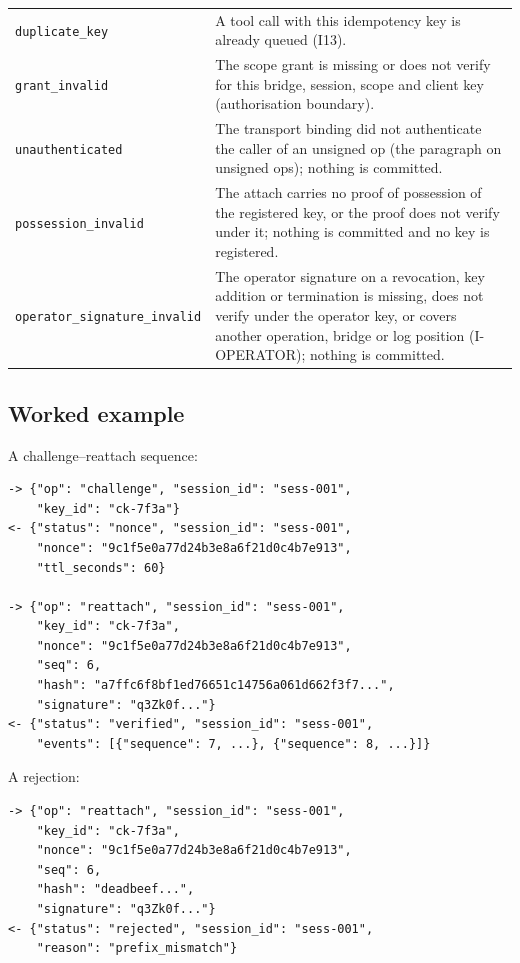 \begin{longtable}{p{} p{}}
\texttt{duplicate\_key} & A tool call with this idempotency key is already queued (I13). \\
\texttt{grant\_invalid} & The scope grant is missing or does not verify for this bridge, session, scope and client key (authorisation boundary). \\
\texttt{unauthenticated} & The transport binding did not authenticate the caller of an unsigned op (the paragraph on unsigned ops); nothing is committed. \\
\texttt{possession\_invalid} & The attach carries no proof of possession of the registered key, or the proof does not verify under it; nothing is committed and no key is registered. \\
\texttt{operator\_signature\_invalid} & The operator signature on a revocation, key addition or termination is missing, does not verify under the operator key, or covers another operation, bridge or log position (I-OPERATOR); nothing is committed. \\
\bottomrule
\end{longtable}

\subsection{Worked example}

A challenge--reattach sequence:

\begin{lstlisting}
-> {"op": "challenge", "session_id": "sess-001",
    "key_id": "ck-7f3a"}
<- {"status": "nonce", "session_id": "sess-001",
    "nonce": "9c1f5e0a77d24b3e8a6f21d0c4b7e913",
    "ttl_seconds": 60}

-> {"op": "reattach", "session_id": "sess-001",
    "key_id": "ck-7f3a",
    "nonce": "9c1f5e0a77d24b3e8a6f21d0c4b7e913",
    "seq": 6,
    "hash": "a7ffc6f8bf1ed76651c14756a061d662f3f7...",
    "signature": "q3Zk0f..."}
<- {"status": "verified", "session_id": "sess-001",
    "events": [{"sequence": 7, ...}, {"sequence": 8, ...}]}
\end{lstlisting}

\noindent A rejection:

\begin{lstlisting}
-> {"op": "reattach", "session_id": "sess-001",
    "key_id": "ck-7f3a",
    "nonce": "9c1f5e0a77d24b3e8a6f21d0c4b7e913",
    "seq": 6,
    "hash": "deadbeef...",
    "signature": "q3Zk0f..."}
<- {"status": "rejected", "session_id": "sess-001",
    "reason": "prefix_mismatch"}
\end{lstlisting}

